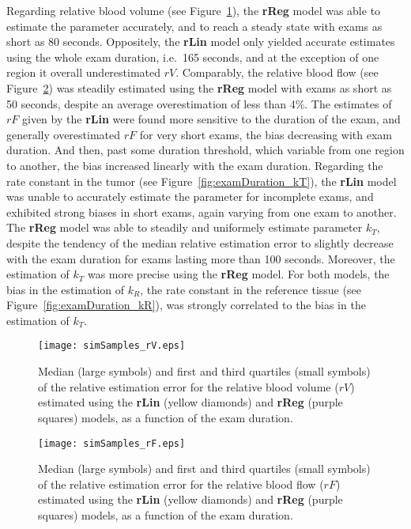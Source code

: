 Regarding relative blood volume (see Figure~\ref{fig:examDuration_rV}), the \textbf{rReg} model was able to estimate the parameter accurately, and to reach a steady state with exams as short as 80 seconds.
Oppositely, the \textbf{rLin} model only yielded accurate estimates using the whole exam duration, i.e.~165 seconds, and at the exception of one region it overall underestimated $rV$.
Comparably, the relative blood flow (see Figure~\ref{fig:examDuration_rF}) was steadily estimated using the \textbf{rReg} model with exams as short as 50 seconds, despite an average overestimation of less than 4\%.
The estimates of $rF$ given by the \textbf{rLin} were found more sensitive to the duration of the exam, and generally overestimated $rF$ for very short exams, the bias decreasing with exam duration.
And then, past some duration threshold, which variable from one region to another, the bias increased linearly with the exam duration.
Regarding the rate constant in the tumor (see Figure~\ref{fig:examDuration_kT}), the \textbf{rLin} model was unable to accurately estimate the parameter for incomplete exams, and exhibited strong biases in short exams, again varying from one exam to another. 
The \textbf{rReg} model was able to steadily and uniformely estimate parameter $k_T$, despite the tendency of the median relative estimation error to slightly decrease with the exam duration for exams lasting more than 100 seconds.
Moreover, the estimation of $k_T$ was more precise using the \textbf{rReg} model.
For both models, the bias in the estimation of $k_R$, the rate constant in the reference tissue (see Figure~\ref{fig:examDuration_kR}), was strongly correlated to the bias in the estimation of $k_T$.


\begin{figure}
\texttt{[image: simSamples\_rV.eps]}
\caption{Median (large symbols) and first and third quartiles (small symbols) of the relative estimation error for the relative blood volume ($rV$) estimated using the \textbf{rLin} (yellow diamonds) and \textbf{rReg} (purple squares) models, as a function of the exam duration.}
\label{fig:examDuration_rV}
\end{figure}

\begin{figure}
\texttt{[image: simSamples\_rF.eps]}
\caption{Median (large symbols) and first and third quartiles (small symbols) of the relative estimation error for the relative blood flow ($rF$) estimated using the \textbf{rLin} (yellow diamonds) and \textbf{rReg} (purple squares) models, as a function of the exam duration.}
\label{fig:examDuration_rF}
\end{figure}

